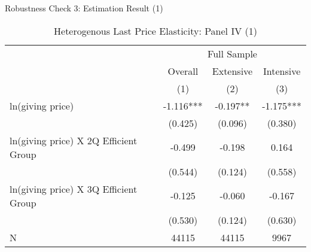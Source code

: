 \documentclass[
  ignorenonframetext,
]{beamer}
\begin{document}
\begin{frame}{Robustness Check 3: Estimation Result (1)}
\protect\hypertarget{robustness-check-3-estimation-result-1}{}
\begin{table}

\caption{\label{tab:kableHeteroShortElasticitySlide1}Heterogenous Last Price Elasticity: Panel IV (1)}
\centering
\fontsize{8}{10}\selectfont
\begin{tabular}[t]{lccc}
\toprule
\multicolumn{1}{c}{ } & \multicolumn{3}{c}{Full Sample} \\
\cmidrule(l{3pt}r{3pt}){2-4}
\multicolumn{1}{c}{ } & \multicolumn{1}{c}{Overall} & \multicolumn{1}{c}{Extensive} & \multicolumn{1}{c}{Intensive} \\
\cmidrule(l{3pt}r{3pt}){2-2} \cmidrule(l{3pt}r{3pt}){3-3} \cmidrule(l{3pt}r{3pt}){4-4}
 & (1) & (2) & (3)\\
\midrule
ln(giving price) & -1.116*** & -0.197** & -1.175***\\
 & (0.425) & (0.096) & (0.380)\\
ln(giving price) X 2Q Efficient Group & -0.499 & -0.198 & 0.164\\
 & (0.544) & (0.124) & (0.558)\\
ln(giving price) X 3Q Efficient Group & -0.125 & -0.060 & -0.167\\
 & (0.530) & (0.124) & (0.630)\\
N & 44115 & 44115 & 9967\\
\bottomrule
\end{tabular}
\end{table}
\end{frame}
\end{document}
